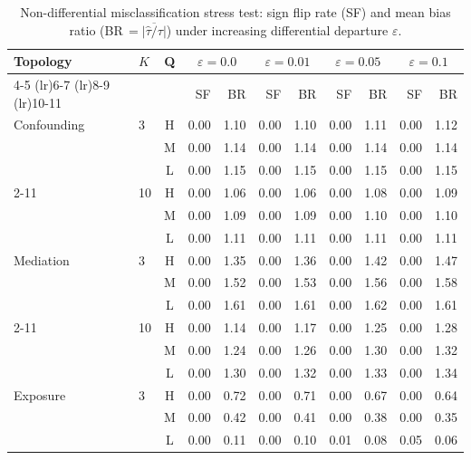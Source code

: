 \begin{table}[t]
\centering
\caption{Non-differential misclassification stress test: sign flip rate (SF) and mean bias ratio (BR\,$=\overline{|\hat\tau/\tau|}$) under increasing differential departure $\varepsilon$.}
\label{tab:stress-test}
\small\setlength{\tabcolsep}{3.5pt}
\begin{tabular}{llcrrrrrrrr}
\toprule
Topology & $K$ & Q & \multicolumn{2}{c}{$\varepsilon\!=\!0.0$} & \multicolumn{2}{c}{$\varepsilon\!=\!0.01$} & \multicolumn{2}{c}{$\varepsilon\!=\!0.05$} & \multicolumn{2}{c}{$\varepsilon\!=\!0.1$} \\
\cmidrule(lr){4-5} \cmidrule(lr){6-7} \cmidrule(lr){8-9} \cmidrule(lr){10-11}
 & & & {\scriptsize SF} & {\scriptsize BR} & {\scriptsize SF} & {\scriptsize BR} & {\scriptsize SF} & {\scriptsize BR} & {\scriptsize SF} & {\scriptsize BR} \\
\midrule
Confounding & 3 & H & 0.00 & 1.10 & 0.00 & 1.10 & 0.00 & 1.11 & 0.00 & 1.12 \\
 &  & M & 0.00 & 1.14 & 0.00 & 1.14 & 0.00 & 1.14 & 0.00 & 1.14 \\
 &  & L & 0.00 & 1.15 & 0.00 & 1.15 & 0.00 & 1.15 & 0.00 & 1.15 \\
\cmidrule{2-11}
 & 10 & H & 0.00 & 1.06 & 0.00 & 1.06 & 0.00 & 1.08 & 0.00 & 1.09 \\
 &  & M & 0.00 & 1.09 & 0.00 & 1.09 & 0.00 & 1.10 & 0.00 & 1.10 \\
 &  & L & 0.00 & 1.11 & 0.00 & 1.11 & 0.00 & 1.11 & 0.00 & 1.11 \\
\midrule
Mediation & 3 & H & 0.00 & 1.35 & 0.00 & 1.36 & 0.00 & 1.42 & 0.00 & 1.47 \\
 &  & M & 0.00 & 1.52 & 0.00 & 1.53 & 0.00 & 1.56 & 0.00 & 1.58 \\
 &  & L & 0.00 & 1.61 & 0.00 & 1.61 & 0.00 & 1.62 & 0.00 & 1.61 \\
\cmidrule{2-11}
 & 10 & H & 0.00 & 1.14 & 0.00 & 1.17 & 0.00 & 1.25 & 0.00 & 1.28 \\
 &  & M & 0.00 & 1.24 & 0.00 & 1.26 & 0.00 & 1.30 & 0.00 & 1.32 \\
 &  & L & 0.00 & 1.30 & 0.00 & 1.32 & 0.00 & 1.33 & 0.00 & 1.34 \\
\midrule
Exposure & 3 & H & 0.00 & 0.72 & 0.00 & 0.71 & 0.00 & 0.67 & 0.00 & 0.64 \\
 &  & M & 0.00 & 0.42 & 0.00 & 0.41 & 0.00 & 0.38 & 0.00 & 0.35 \\
 &  & L & 0.00 & 0.11 & 0.00 & 0.10 & 0.01 & 0.08 & 0.05 & 0.06 \\

\end{tabular}
\end{table}
